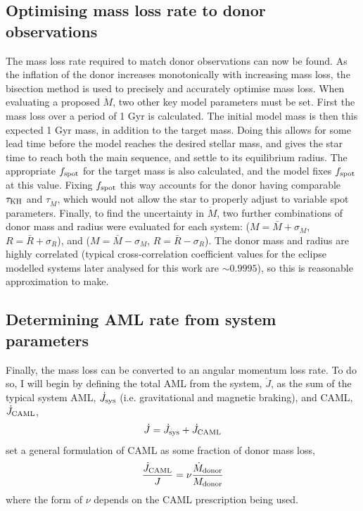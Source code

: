\subsection{Optimising mass loss rate to donor observations}
\label{sect:modelling:optimising mass loss rate to observations}

The mass loss rate required to match donor observations can now be found. As the inflation of the donor increases monotonically with increasing mass loss, the bisection method is used to precisely and accurately optimise mass loss.
When evaluating a proposed $\dot M$, two other key model parameters must be set. First the mass loss over a period of 1 Gyr is calculated. The initial model mass is then this expected 1 Gyr mass, in addition to the target mass. Doing this allows for some lead time before the model reaches the desired stellar mass, and gives the star time to reach both the main sequence, and settle to its equilibrium radius.
The appropriate $f_{\rm spot}$ for the target mass is also calculated, and the model fixes $f_{\rm spot}$ at this value. Fixing $f_{\rm spot}$ this way accounts for the donor having comparable $\tau_{\rm KH}$ and $\tau_{\dot M}$, which would not allow the star to properly adjust to variable spot parameters.
Finally, to find the uncertainty in $\dot M$, two further combinations of donor mass and radius were evaluated for each system: ($M = \bar M + \sigma_M$, $R = \bar R + \sigma_R$), and ($M = \bar M - \sigma_M$, $R = \bar R - \sigma_R$). The donor mass and radius are highly correlated (typical cross-correlation coefficient values for the eclipse modelled systems later analysed for this work are $\sim 0.9995$), so this is reasonable approximation to make.


\subsection{Determining AML rate from system parameters}
\label{sect:modelling:getting AML rate from system parameters}

Finally, the mass loss can be converted to an angular momentum loss rate. To do so, I will begin by defining the total AML from the system, $\dot J$, as the sum of the typical system AML, $\dot J_{\rm sys}$ (i.e. gravitational and magnetic braking), and CAML, $\dot J_{\rm CAML}$,
\begin{equation}
    \dot J = \dot J_{\rm sys} + \dot J_{\rm CAML}
\end{equation}
\citet{king1995} set a general formulation of CAML as some fraction of donor mass loss,
\begin{equation}
    \frac{\dot J_{\rm CAML}}{J} = \nu \frac{\dot M_{\rm donor}}{M_{\rm donor}}
\end{equation}
where the form of $\nu$ depends on the CAML prescription being used.

